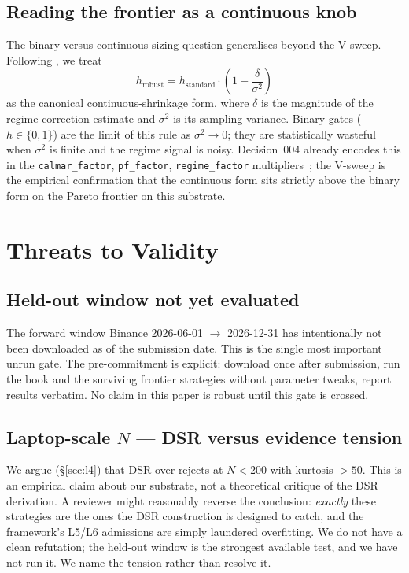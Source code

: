 \documentclass[11pt]{article}
\begin{document}
\subsection{Reading the frontier as a continuous knob}

The binary-versus-continuous-sizing question generalises beyond the V-sweep.
Following \citet{ravagnani2026shrinkage}, we treat
\begin{equation}
h_{\mathrm{robust}} = h_{\mathrm{standard}} \cdot \left(1 - \frac{\delta}{\sigma^2}\right)
\end{equation}
as the canonical continuous-shrinkage form, where $\delta$ is the magnitude
of the regime-correction estimate and $\sigma^2$ is its sampling variance.
Binary gates ($h \in \{0, 1\}$) are the limit of this rule as $\sigma^2 \to
0$; they are statistically wasteful when $\sigma^2$ is finite and the
regime signal is noisy. Decision~004 already encodes this in the
\texttt{calmar\_factor}, \texttt{pf\_factor}, \texttt{regime\_factor}
multipliers~\citep{decision_004}; the V-sweep is the empirical confirmation
that the continuous form sits strictly above the binary form on the Pareto
frontier on this substrate.

\section{Threats to Validity}
\label{sec:threats}

\subsection{Held-out window not yet evaluated}
The forward window Binance 2026-06-01 $\to$ 2026-12-31 has intentionally not
been downloaded as of the submission date. This is the single most important
unrun gate. The pre-commitment is explicit: download once after submission,
run the book and the surviving frontier strategies without parameter tweaks,
report results verbatim. No claim in this paper is robust until this gate is
crossed.

\subsection{Laptop-scale $N$ --- DSR versus evidence tension}
We argue (\S\ref{sec:l4}) that DSR over-rejects at $N < 200$ with kurtosis
$> 50$. This is an empirical claim about our substrate, not a theoretical
critique of the DSR derivation. A reviewer might reasonably reverse the
conclusion: \emph{exactly} these strategies are the ones the DSR construction
is designed to catch, and the framework's L5/L6 admissions are simply
laundered overfitting. We do not have a clean refutation; the held-out
window is the strongest available test, and we have not run it. We name the
tension rather than resolve it.
\end{document}

